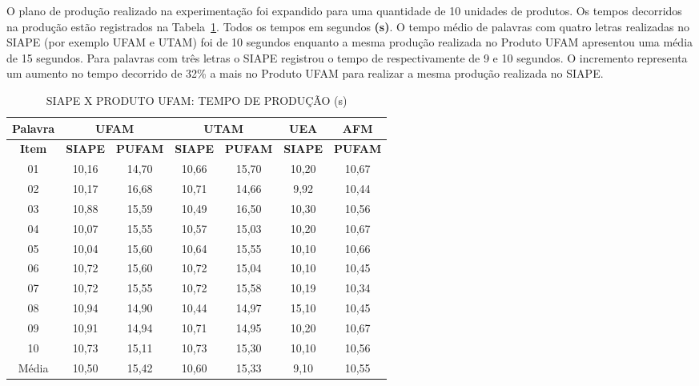 
O plano de produção realizado na experimentação foi expandido para uma quantidade de 10 unidades de produtos. Os tempos decorridos na produção estão registrados na Tabela~\ref{T16}. Todos os tempos em segundos \textbf{(s)}. O tempo médio de palavras com quatro letras realizadas no SIAPE (por exemplo UFAM e UTAM) foi de 10 segundos enquanto a mesma produção realizada no Produto UFAM apresentou uma média de 15 segundos. Para palavras com três letras o SIAPE registrou o tempo de respectivamente de 9 e 10 segundos. O incremento representa um aumento no tempo decorrido de 32\% a mais no Produto UFAM para realizar a mesma produção realizada no SIAPE.

\begin{table}
	\small
	\centering
	\caption{SIAPE X PRODUTO UFAM: TEMPO DE PRODUÇÃO (s)}
	\begin{tabular}{ c | c c | c c | c c }
		\hline
\textbf{ Palavra} & \multicolumn{2}{c}{\textbf{UFAM}}  & \multicolumn{2}{c}{\textbf{UTAM}} & \textbf{ UEA} & \textbf{ AFM} \\ \hline
\textbf{Item} & \textbf{SIAPE} & \textbf{PUFAM} & \textbf{ SIAPE} & \textbf{ PUFAM} & \textbf{ SIAPE} & \textbf{ PUFAM}\\ 
		\hline
 
  01 & 10,16 &  14,70  & 10,66 & 15,70 & 10,20 &  10,67 \\ \hline
  02 & 10,17 &  16,68  & 10,71 & 14,66 & 9,92  &  10,44 \\ \hline
  03 & 10,88 &  15,59  & 10,49 & 16,50 & 10,30 &  10,56	\\ \hline
  04 & 10,07 &  15,55  & 10,57 & 15,03 & 10,20 &  10,67	\\ \hline
  05 & 10,04 &  15,60  & 10,64 & 15,55 & 10,10 &  10,66	\\ \hline
  06 & 10,72 &  15,60  & 10,72 & 15,04 & 10,10 &  10,45	\\ \hline
  07 & 10,72 &  15,55  & 10,72 & 15,58 & 10,19 &  10,34	\\ \hline
  08 & 10,94 &  14,90  & 10,44 & 14,97 & 15,10 &  10,45	\\ \hline
  09 & 10,91 &  14,94  & 10,71 & 14,95 & 10,20 &  10,67 \\ \hline
  10 & 10,73 &  15,11  & 10,73 & 15,30 & 10,10 &  10,56	\\ \hline
  \hline
  Média & 10,50 &  15,42 	& 10,60 & 15,33 & 9,10 &  10,55	\\ \hline
 	\end{tabular}												
	\label{T16}\par
\end{table}

